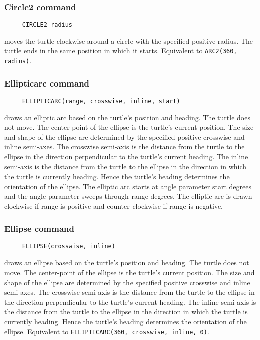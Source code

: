 \subsubsection*{Circle2 command}
\begin{verbatim}
     CIRCLE2 radius
\end{verbatim}
moves the turtle clockwise around a circle with the specified positive
radius.  The turtle ends in the same position in which it starts.
Equivalent to \texttt{ARC2(360, radius)}.

\subsubsection*{Ellipticarc command}
\begin{verbatim}
     ELLIPTICARC(range, crosswise, inline, start)
\end{verbatim}
draws an elliptic arc based on the turtle's position and heading.  The
turtle does not move.  The center-point of the ellipse is the turtle's
current position.  The size and shape of the ellipse are determined by
the specified positive crosswise and inline semi-axes.  The crosswise
semi-axis is the distance from the turtle to the ellipse in the
direction perpendicular to the turtle's current heading.  The inline
semi-axis is the distance from the turtle to the ellipse in the
direction in which the turtle is currently heading.  Hence the
turtle's heading determines the orientation of the ellipse.  The
elliptic arc starts at angle parameter start degrees and the angle
parameter sweeps through range degrees.  The elliptic arc is drawn
clockwise if range is positive and counter-clockwise if range is
negative.

\subsubsection*{Ellipse command}
\begin{verbatim}
     ELLIPSE(crosswise, inline)
\end{verbatim}
draws an ellipse based on the turtle's position and heading.  The
turtle does not move.  The center-point of the ellipse is the turtle's
current position.  The size and shape of the ellipse are determined by
the specified positive crosswise and inline semi-axes.  The crosswise
semi-axis is the distance from the turtle to the ellipse in the
direction perpendicular to the turtle's current heading.  The inline
semi-axis is the distance from the turtle to the ellipse in the
direction in which the turtle is currently heading.  Hence the
turtle's heading determines the orientation of the ellipse.
Equivalent to \texttt{ELLIPTICARC(360, crosswise, inline, 0)}.


